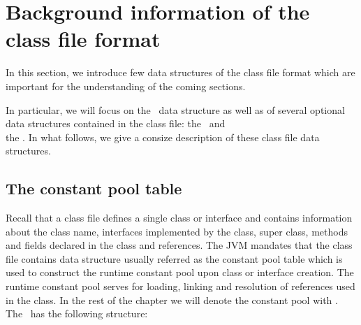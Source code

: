 \newcommand{\cpLength}{\mbox{\rm\textsf{cpLength}}}
\newcommand{\cpElems}{\mbox{\rm\textsf{cpElems}}}
\newcommand{\classConst}{\mbox{\rm\textbf{cpConst}}}


\section{Background information of the class file format}
In this section,  we introduce few data structures of the class file format which are important
for the understanding of the coming sections.



 In particular, we will focus on the 
 \constantPool \ data structure as well as of several optional data structures
 contained in the  class file: the \localVariableTable \ and \\
the \lineNumberTable. 
In what follows, we give a consize description of these class file data structures. 


\subsection{The constant pool table}
 Recall that a class file defines
a single class or interface and contains information about  the class name, interfaces implemented by the class, super class, methods
 and fields declared in the class and references. The JVM  \cite{VMSpec} mandates that the class
 file contains data structure usually referred as the constant pool table  which is used to construct the runtime constant pool upon class or 
interface creation. The runtime constant pool serves for loading, linking and resolution of references used in the class.
In the rest of the chapter we will denote the constant pool with \constantPool.
The \constantPool \  has the following structure:

